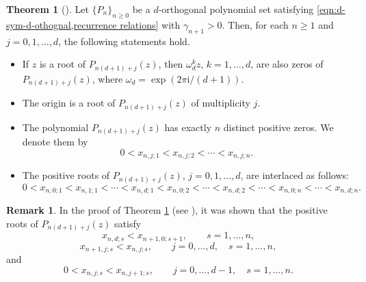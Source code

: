\documentclass[preprint,3p,10pt]{elsarticle}
\theoremstyle{definition}
\newtheorem{remark}{Remark}[section]
\newtheorem{theorem}{Theorem}[section]
\begin{document}
\begin{theorem}[{\cite[Theorem~2.2]{romdhane2008zeros}}]
\label{thm:ben-romdhane-zero-theorem}
Let \(\{P_n\}_{n\geq 0}\) be a \(d\)-orthogonal polynomial set satisfying \eqref{eqn:d-sym-d-othognal,recurrence relations} with $\gamma_{n+1}>0$.
Then, for each \(n\geq 1\) and \(j=0,1,\ldots,d\), the following statements hold.
\begin{itemize}
    \item[(a)] If \(z\) is a root of \(P_{n(d+1)+j}(z)\), then
    \(\omega_d^k z\), \(k=1,\ldots,d\), are also zeros of
    \(P_{n(d+1)+j}(z)\), where $\omega_d=\exp\left(2\pi\mathrm{i}/(d+1)\right)$.

    \item[(b)] The origin is a root of \(P_{n(d+1)+j}(z)\) of multiplicity \(j\).

    \item[(c)] The polynomial \(P_{n(d+1)+j}(z)\) has exactly \(n\) distinct positive zeros. We denote them by
    \begin{equation}
        0<x_{n,j;1}<x_{n,j;2}<\cdots<x_{n,j;n}.
    \end{equation}

    \item[(d)] The positive roots of
    \(P_{n(d+1)+j}(z)\), \(j=0,1,\ldots,d\), are interlaced as follows:
    \begin{equation}
    \label{eq:BR-same-level-interlacing}
        0
        <
        x_{n,0;1}
        <
        x_{n,1;1}
        <
        \cdots
        <
        x_{n,d;1}
        <
        x_{n,0;2}
        <
        \cdots
        <
        x_{n,d;2}
        <
        \cdots
        <
        x_{n,0;n}
        <
        \cdots
        <
        x_{n,d;n}.
    \end{equation}
\end{itemize}
\end{theorem}
\begin{remark}
In the proof of Theorem \ref{thm:ben-romdhane-zero-theorem} (see \cite{romdhane2008zeros}), it was shown that the positive roots of \(P_{n(d+1)+j}(z)\) satisfy
\begin{equation} 
x_{n,d;s}<x_{n+1,0;s+1}, \qquad s=1,\ldots,n, \label{eq:BR-root-relation-1} 
\end{equation} 
\begin{equation} 
x_{n+1,j;s}<x_{n,j;s}, \qquad j=0,\ldots,d,\quad s=1,\ldots,n, \label{eq:BR-root-relation-2} 
\end{equation} 
and 
\begin{equation} 
0<x_{n,j;s}<x_{n,j+1;s}, \qquad j=0,\ldots,d-1,\quad s=1,\ldots,n. 
\label{eq:BR-root-relation-3} 
\end{equation}
\end{remark}
\end{document}
